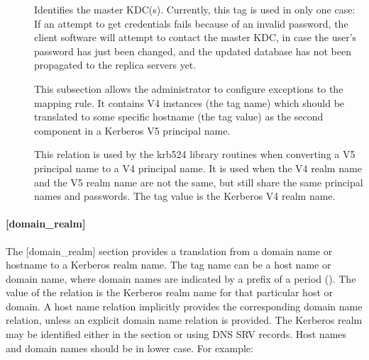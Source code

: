\documentclass[letterpaper,10pt,english]{sphinxmanual}
\begin{document}
\begin{description}
\item[{}] \leavevmode
Identifies the master KDC(s).  Currently, this tag is used in only
one case: If an attempt to get credentials fails because of an
invalid password, the client software will attempt to contact the
master KDC, in case the user’s password has just been changed, and
the updated database has not been propagated to the replica
servers yet.

\item[{}] \leavevmode
This subsection allows the administrator to configure exceptions
to the  mapping rule.  It contains V4 instances
(the tag name) which should be translated to some specific
hostname (the tag value) as the second component in a Kerberos V5
principal name.

\item[{}] \leavevmode
This relation is used by the krb524 library routines when
converting a V5 principal name to a V4 principal name.  It is used
when the V4 realm name and the V5 realm name are not the same, but
still share the same principal names and passwords. The tag value
is the Kerberos V4 realm name.

\end{description}


\paragraph{{[}domain\_realm{]}}
\label{\detokenize{admin/conf_files/krb5_conf:id3}}\label{\detokenize{admin/conf_files/krb5_conf:domain-realm}}
The {[}domain\_realm{]} section provides a translation from a domain name
or hostname to a Kerberos realm name.  The tag name can be a host name
or domain name, where domain names are indicated by a prefix of a
period ().  The value of the relation is the Kerberos realm name
for that particular host or domain.  A host name relation implicitly
provides the corresponding domain name relation, unless an explicit domain
name relation is provided.  The Kerberos realm may be
identified either in the {\hyperref[\detokenize{admin/conf_files/krb5_conf:realms}]{}} section or using DNS SRV records.
Host names and domain names should be in lower case.  For example:

%
\begin{sphinxVerbatim}[commandchars=\\\{\}]
\PYG{p}{[}\PYG{p}{]}
      
      
      
\end{sphinxVerbatim}
\end{document}
